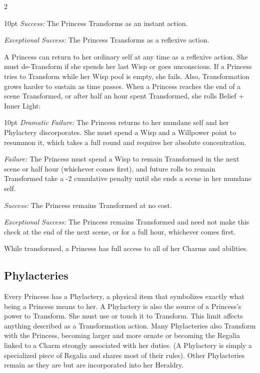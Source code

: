\begin{multicols}{2}
\begin{myindentpar}{10pt}
    \emph{Success:} The Princess Transforms as an instant action. 
    
    \emph{Exceptional Success:} The Princess Transforms as a reflexive action.
\end{myindentpar}

A Princess can return to her ordinary self at any time as a reflexive action. She must de-Transform if she spends her last Wisp or goes unconscious. If a Princess tries to Transform while her Wisp pool is empty, she fails. Also, Transformation grows harder to sustain as time passes. When a Princess reaches the end of a scene Transformed, or after half an hour spent Transformed, she rolls Belief + Inner Light: 

\begin{myindentpar}{10pt}
    \emph{Dramatic Failure:} The Princess returns to her mundane self and her Phylactery discorporates. She must spend a Wisp and a Willpower point to resummon it, which takes a full round and requires her absolute concentration. 
    
    \emph{Failure:} The Princess must spend a Wisp to remain Transformed in the next scene or half hour (whichever comes first), and future rolls to remain Transformed take a -2 cumulative penalty until she ends a scene in her mundane self. 
    
    \emph{Success:} The Princess remains Transformed at no cost. 
    
    \emph{Exceptional Success:} The Princess remains Transformed and need not make this check at the end of the next scene, or for a full hour, whichever comes first.
\end{myindentpar}

While transformed, a Princess has full access to all of her Charms and abilities. 

\subsection*{Phylacteries}

Every Princess has a Phylactery, a physical item that symbolizes exactly what being a Princess means to her. A Phylactery is also the source of a Princess's power to Transform. She must use or touch it to Transform. This limit affects anything described as a Transformation action. Many Phylacteries also Transform with the Princess, becoming larger and more ornate or becoming the Regalia linked to a Charm strongly associated with her duties. (A Phylactery is simply a specialized piece of Regalia and shares most of their rules). Other Phylacteries remain as they are but are incorporated into her Heraldry. 


\end{multicols}
